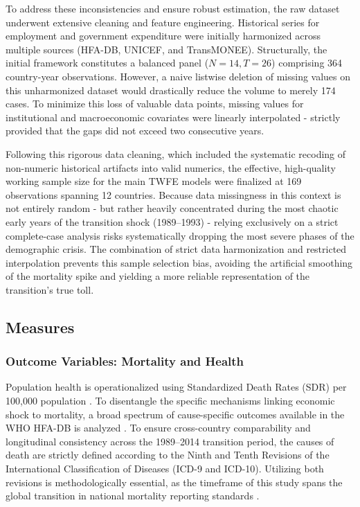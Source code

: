 \documentclass[en,magisterska]{pracamgr}
\begin{document}
To address these inconsistencies and ensure robust estimation, the raw dataset underwent extensive cleaning and feature engineering. Historical series for employment 
and government expenditure were initially harmonized across multiple sources (HFA-DB, UNICEF, and TransMONEE). Structurally, the initial framework constitutes a balanced 
panel ($N=14, T=26$) comprising 364 country-year observations. However, a naive listwise deletion of missing values on this unharmonized dataset would drastically reduce 
the volume to merely 174 cases. To minimize this loss of valuable data points, missing values for institutional and macroeconomic covariates were linearly interpolated  -  strictly 
provided that the gaps did not exceed two consecutive years. 

Following this rigorous data cleaning, which included the systematic recoding of non-numeric historical artifacts into valid numerics, the effective, high-quality working sample size 
for the main TWFE models were finalized at 169 observations spanning 12 countries. Because data missingness in this context is not entirely random  -  but rather heavily concentrated during 
the most chaotic early years of the transition shock (1989--1993)  -  relying exclusively on a strict complete-case analysis risks systematically dropping the most severe phases 
of the demographic crisis. The combination of strict data harmonization and restricted interpolation prevents this sample selection bias, avoiding the artificial smoothing of the 
mortality spike and yielding a more reliable representation of the transition's true toll.

\subsection{Measures}

\subsubsection*{Outcome Variables: Mortality and Health}

Population health is operationalized using Standardized Death Rates (SDR) per 100,000 population \citep{B_Brainerd1998, Stuckler2009}. To disentangle the 
specific mechanisms linking economic shock to mortality, a broad spectrum of cause-specific outcomes available in the WHO HFA-DB is analyzed \citep{WHO_HFA}. 
To ensure cross-country comparability and longitudinal consistency across the 1989--2014 transition period, the causes of death are strictly defined according 
to the Ninth and Tenth Revisions of the International Classification of Diseases (ICD-9 and ICD-10). Utilizing both revisions is methodologically 
essential, as the timeframe of this study spans the global transition in national mortality reporting standards \citep{WHO1977, WHO1992}.
\end{document}

